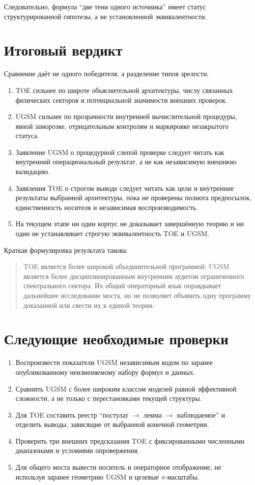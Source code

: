 \documentclass[12pt,a4paper]{article}
\begin{document}
Следовательно, формула ``две тени одного источника'' имеет статус
структурированной гипотезы, а не установленной эквивалентности.

\section{Итоговый вердикт}

Сравнение даёт не одного победителя, а разделение типов зрелости.

\begin{enumerate}
    \item TOE сильнее по широте объяснительной архитектуры, числу связанных
    физических секторов и потенциальной значимости внешних проверок.
    \item UGSM сильнее по прозрачности внутренней вычислительной процедуры,
    явной заморозке, отрицательным контролям и маркировке незакрытого статуса.
    \item Заявление UGSM о процедурной слепой проверке следует читать как
    внутренний операциональный результат, а не как независимую внешнюю
    валидацию.
    \item Заявления TOE о строгом выводе следует читать как цели и внутренние
    результаты выбранной архитектуры, пока не проверены полнота предпосылок,
    единственность носителя и независимая воспроизводимость.
    \item На текущем этапе ни один корпус не доказывает завершённую теорию и
    ни один не устанавливает строгую эквивалентность TOE и UGSM.
\end{enumerate}

Краткая формулировка результата такова:
\begin{quote}
TOE является более широкой объединительной программой; UGSM является более
дисциплинированным внутренним аудитом ограниченного спектрального сектора.
Их общий операторный язык оправдывает дальнейшее исследование моста, но не
позволяет объявить одну программу доказанной или свести их к единой теории.
\end{quote}

\section{Следующие необходимые проверки}

\begin{enumerate}
    \item Воспроизвести показатели UGSM независимым кодом по заранее
    опубликованному неизменяемому набору формул и данных.
    \item Сравнить UGSM с более широким классом моделей равной эффективной
    сложности, а не только с перестановками текущей структуры.
    \item Для TOE составить реестр ``постулат $\to$ лемма $\to$ наблюдаемое''
    и отделить выводы, зависящие от выбранной конечной геометрии.
    \item Проверить три внешних предсказания TOE с фиксированными численными
    диапазонами и условиями опровержения.
    \item Для общего моста вывести носитель и операторное отображение, не
    используя заранее геометрию UGSM и целевые $\pi$-масштабы.
\end{enumerate}
\end{document}
